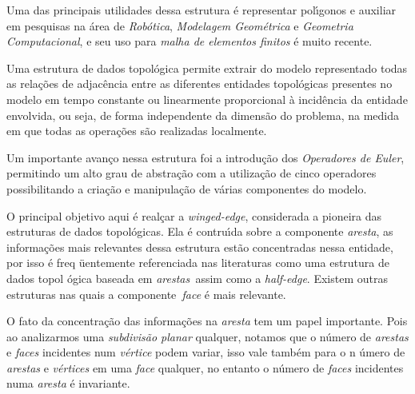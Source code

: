 \documentclass[12pt,a4paper]{book}
\begin{document}
Uma das principais utilidades dessa estrutura \'{e} representar pol\'{\i}gonos e auxiliar 
em pesquisas na \'{a}rea de \textit{Rob\'{o}tica}, \textit{Modelagem Geom\'{e}trica}
e \textit{Geometria Computacional}, e seu uso para \textit{malha de elementos
finitos }\'{e} muito recente.

Uma estrutura de dados topol\'{o}gica permite extrair do modelo representado
todas as rela\c{c}\~{o}es de adjac\^{e}ncia entre as diferentes entidades
topol\'{o}gicas presentes no modelo em tempo constante ou linearmente
proporcional \`{a} incid\^{e}ncia da entidade envolvida, ou seja, de forma
independente da dimens\~{a}o do problema, na medida em que todas as opera\c{c}\~{o}es s\~{a}o realizadas localmente.

Um importante avan\c{c}o nessa estrutura foi a introdu\c{c}\~{a}o dos \textit{Operadores de Euler}, permitindo um alto grau de abstra\c{c}\~{a}o com a utiliza\c{c}\~{a}o de cinco operadores possibilitando a cria\c{c}\~{a}o e manipula\c{c}\~{a}o de v\'{a}rias componentes do modelo.

O principal objetivo aqui \'e real\c{c}ar a \textit{winged-edge}, considerada a
pioneira das estruturas de dados topol\'{o}gicas. Ela \'{e} contru\'{\i}da
sobre a componente \textit{aresta}, as informa\c{c}\~{o}es mais relevantes
dessa estrutura est\~{a}o concentradas nessa entidade, por isso \'{e} freq%
\"{u}entemente referenciada nas literaturas como uma estrutura de dados topol%
\'{o}gica baseada em \textit{arestas}\textit{\ }assim como a \textit{half-edge}.
Existem outras estruturas nas quais a componente\textit{\ face} \'{e} mais
relevante.

O fato da concentra\c{c}\~{a}o das informa\c{c}\~{o}es na \textit{aresta} tem
um papel importante. Pois ao analizarmos uma \textit{subdivis\~{a}o planar }%
qualquer, notamos que o n\'{u}mero de \textit{arestas} e \textit{faces}
incidentes num \textit{v\'{e}rtice} podem variar, isso vale tamb\'{e}m para o n%
\'{u}mero de \textit{arestas} e \textit{v\'{e}rtices} em uma \textit{face}
qualquer, no entanto o n\'{u}mero de \textit{faces} incidentes numa \textit{%
aresta} \'{e} invariante.
\end{document}
